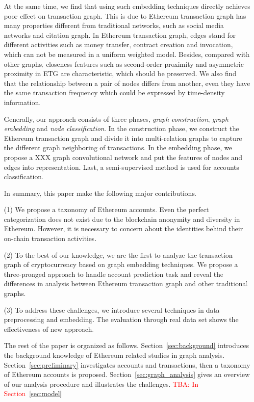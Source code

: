 At the same time, we find that using such embedding techniques directly achieves poor effect on transaction graph. This is due to Ethereum transaction graph has many properties different from traditional networks, such as social media networks and citation graph. In Ethereum transaction graph, edges stand for different activities such as money transfer, contract creation and invocation, which can not be measured in a uniform weighted model. Besides, compared with other graphs, closeness features such as second-order proximity and asymmetric proximity in ETG are characteristic, which should be preserved. We also find that the relationship between a pair of nodes differs from another, even they have the same transaction frequency which could be expressed by time-density information.

Generally, our approach consists of three phases, \emph{graph construction}, \emph{graph embedding} and \emph{node classification}. In the construction phase, we construct the Ethereum transaction graph and divide it into multi-relation graphs to capture the different graph neighboring of transactions. In the embedding phase, we propose a XXX graph convolutional network and put the features of nodes and edges into representation. Last, a semi-supervised method is used for accounts classification.

In summary, this paper make the following major contributions.

(1) We propose a taxonomy of Ethereum accounts. Even the perfect categorization does not exist due to the blockchain anonymity and diversity in Ethereum. However, it is necessary to concern about the identities behind their on-chain transaction activities.

(2) To the best of our knowledge, we are the first to analyze the transaction graph of cryptocurrency based on graph embedding techniques. We propose a three-pronged approach to handle account prediction task and reveal the differences in analysis between Ethereum transaction graph and other traditional graphs.

(3) To address these challenges, we introduce several techniques in data preprocessing and embedding. The evaluation through real data set shows the effectiveness of new approach.

The rest of the paper is organized as follows. Section~\ref{sec:background} introduces the background knowledge of Ethereum related studies in graph analysis. Section~\ref{sec:preliminary} investigates accounts and transactions, then a taxonomy of Ethereum accounts is proposed. Section~\ref{sec:graph_analysis} gives an overview of our analysis procedure and illustrates the challenges. \textcolor{red}{TBA: In Section~\ref{sec:model}}

